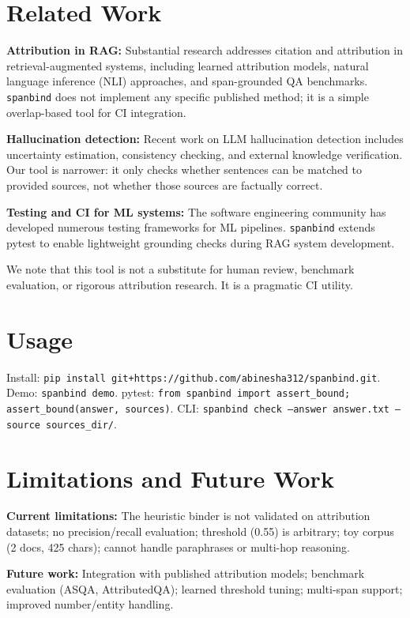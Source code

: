 \documentclass{article}
\begin{document}
\section{Related Work}

\textbf{Attribution in RAG:} Substantial research addresses citation and attribution in retrieval-augmented systems, including learned attribution models, natural language inference (NLI) approaches, and span-grounded QA benchmarks. \texttt{spanbind} does not implement any specific published method; it is a simple overlap-based tool for CI integration.

\textbf{Hallucination detection:} Recent work on LLM hallucination detection includes uncertainty estimation, consistency checking, and external knowledge verification. Our tool is narrower: it only checks whether sentences can be matched to provided sources, not whether those sources are factually correct.

\textbf{Testing and CI for ML systems:} The software engineering community has developed numerous testing frameworks for ML pipelines. \texttt{spanbind} extends pytest to enable lightweight grounding checks during RAG system development.

We note that this tool is not a substitute for human review, benchmark evaluation, or rigorous attribution research. It is a pragmatic CI utility.

\section{Usage}

Install: \texttt{pip install git+https://github.com/abinesha312/spanbind.git}. Demo: \texttt{spanbind demo}. pytest: \texttt{from spanbind import assert\_bound; assert\_bound(answer, sources)}. CLI: \texttt{spanbind check --answer answer.txt --source sources\_dir/}.

\section{Limitations and Future Work}

\textbf{Current limitations:} The heuristic binder is not validated on attribution datasets; no precision/recall evaluation; threshold (0.55) is arbitrary; toy corpus (2 docs, 425 chars); cannot handle paraphrases or multi-hop reasoning.

\textbf{Future work:} Integration with published attribution models; benchmark evaluation (ASQA, AttributedQA); learned threshold tuning; multi-span support; improved number/entity handling.
\end{document}
